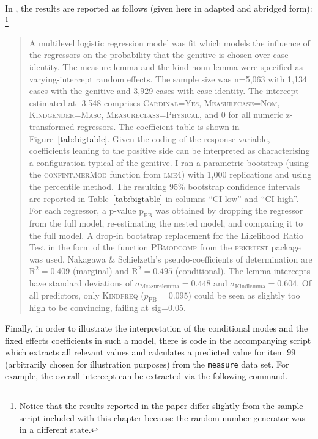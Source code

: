 In \citet{Schaefer2018}, the results are reported as follows (given here in adapted and abridged form):%
\footnote{Notice that the results reported in the paper differ slightly from the sample script included with this chapter because the random number generator was in a different state.}

\begin{quote}
  A multilevel logistic regression model was fit which models the influence of the regressors on the probability that the genitive is chosen over case identity.
  The measure lemma and the kind noun lemma were specified as varying-intercept random effects.
  The sample size was n=5,063 with 1,134 cases with the genitive and 3,929 cases with case identity.
  The intercept estimated at -3.548 comprises \textsc{Cardinal=Yes}, \textsc{Measurecase=Nom}, \textsc{Kindgender=Masc}, \textsc{Measureclass=Physical}, and 0 for all numeric z-transformed regressors.
  The coefficient table is shown in Figure~\ref{tab:bigtable}.
  Given the coding of the response variable, coefficients leaning to the positive side can be interpreted as characterising a configuration typical of the genitive.
  I ran a parametric bootstrap (using the \mbox{\textsc{confint.merMod}} function from \textsc{lme4}) with 1,000 replications and using the percentile method.
  The resulting 95\% bootstrap confidence intervals are reported in Table~\ref{tab:bigtable} in columns ``CI low'' and ``CI high''.
  For each regressor, a p-value $\text{p}_{\text{PB}}$ was obtained by dropping the regressor from the full model, re-estimating the nested model, and comparing it to the full model.
  A drop-in bootstrap replacement for the Likelihood Ratio Test in the form of the function \textsc{PBmodcomp} from the \textsc{pbkrtest} package \citep{HalekohHojsgaard2014} was used. 
  Nakagawa \& Schielzeth's pseudo-coefficients of determination are $\textrm{R}^{\textrm{2}}=0.409$ (marginal) and $\textrm{R}^{\textrm{2}}=0.495$ (conditional).
  The lemma intercepts have standard deviations of $\sigma_{\text{Measurelemma}}=0.448$ and $\sigma_{\text{Kindlemma}}=0.604$.
  Of all predictors, only \textsc{Kindfreq} ($p_{\text{PB}}=0.095$) could be seen as slightly too high to be convincing, failing at sig=0.05.
\end{quote}

Finally, in order to illustrate the interpretation of the conditional modes and the fixed effects coefficients in such a model, there is code in the accompanying script which extracts all relevant values and calculates a predicted value for item 99 (arbitrarily chosen for illustration purposes) from the \texttt{measure} data set.
For example, the overall intercept can be extracted via the following command.

